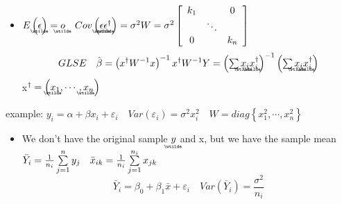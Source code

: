 \documentclass{article}
\begin{document}
\begin{itemize}
\item $E\left( 
\underaccent{\wtilde}{\epsilon}%
\right) =%
\underaccent{\wtilde}{o}%
\quad Cov\left( 
\underaccent{\wtilde}{\epsilon}%
\underaccent{\wtilde}{\epsilon}%
^{\dagger }\right) =\sigma ^{2}W=\sigma ^{2}\left[ 
\begin{array}{ccc}
k_{1} &  & 0 \\ 
& \ddots &  \\ 
0 &  & k_{n}%
\end{array}%
\right] $%
\begin{equation*}
GLSE\quad \hat{\beta}=\left( x^{\dagger }W^{-1}x\right) ^{-1}x^{\dagger
}W^{-1}Y=\left( \tsum 
\underaccent{\wtilde}{x}%
_{i}%
\underaccent{\wtilde}{x}%
_{i}^{\dagger }\right) ^{-1}\left( \tsum 
\underaccent{\wtilde}{x}%
_{i}%
\underaccent{\wtilde}{x}%
_{i}^{\dagger }\right)
\end{equation*}%
x$^{\dagger }=\left( 
\underaccent{\wtilde}{x}%
_{1},\cdots ,%
\underaccent{\wtilde}{x}%
_{n}\right) $
\end{itemize}

\bigskip

example: $y_{i}=\alpha +\beta x_{i}+\varepsilon _{i}\quad Var\left(
\varepsilon _{i}\right) =\sigma ^{2}x_{i}^{2}\quad W=diag\left\{
x_{1}^{2},\cdots ,x_{n}^{2}\right\} $

\begin{itemize}
\item We don't have the original sample $%
\underaccent{\wtilde}{y}%
$ and x, but we have the sample mean $\bar{Y}_{i}=\frac{1}{n_{i}}%
\tsum\limits_{j=1}^{n}y_{j}\quad \bar{x}_{ik}=\frac{1}{n_{i}}%
\tsum\limits_{j=1}^{n_{i}}x_{jk}$%
\begin{equation*}
\bar{Y}_{i}=\beta _{0}+\beta _{1}\bar{x}+\varepsilon _{i}\quad Var\left( 
\bar{Y}_{i}\right) =\frac{\sigma ^{2}}{n_{i}}
\end{equation*}
\end{itemize}
\end{document}
